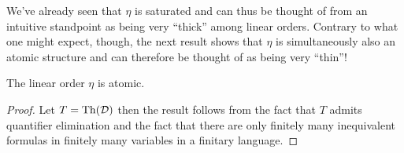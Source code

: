 We've already seen that $\eta$ is saturated and can thus be thought of from an intuitive standpoint as being very ``thick'' among linear orders.  Contrary to what one might expect, though, the next result shows that $\eta$ is simultaneously also an atomic structure and can therefore be thought of as being very ``thin''!

\begin{prp}
	The linear order $\eta$ is atomic.
\end{prp}
\begin{proof}
	Let $T=\operatorname{Th}(\mathcal{D})$ then the result follows from the fact that $T$ admits quantifier elimination and the fact that there are only finitely many inequivalent formulas in finitely many variables in a finitary language.
\end{proof}
